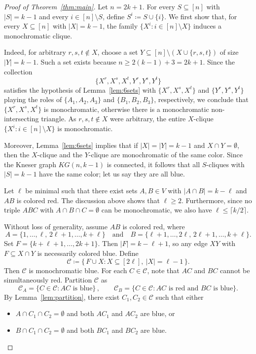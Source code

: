 \documentclass[11pt]{amsart}
\def\cC{{\mathcal{C}}}
\begin{document}
\begin{proof}[Proof of Theorem~\ref{thm:main}]
Let $n = 2k+1$. For every $S \subseteq [n]$ with $|S| = k-1$ and every $i \in [n] \setminus S$, define $S^{i} \coloneq S \cup \{i\}$. 
We first show that, for every $X \subseteq [n]$ with $|X| = k-1$, the family $\{X^{i} : i \in [n] \setminus X\}$ induces a monochromatic clique. 

Indeed, for arbitrary $r,s,t \notin X$, choose a set $Y \subseteq [n] \setminus (X \cup \{r,s,t\})$ of size $|Y| = k-1$. Such a set exists because $n \ge 2(k-1)+3 = 2k+1$. Since the collection
\[
\{X^{r}, X^{s}, X^{t}, Y^{r}, Y^{s}, Y^{t}\}
\]
satisfies the hypothesis of Lemma~\ref{lem:6sets} with $\{X^r, X^s, X^t\}$ and $\{Y^r, Y^s, Y^t\}$ playing the roles of $\{A_1, A_2, A_3\}$ and $\{B_1, B_2, B_3\}$, respectively, we conclude that $\{X^{r}, X^{s}, X^{t}\}$ is monochromatic, otherwise there is a monochromatic non-intersecting triangle. As $r,s,t \notin X$ were arbitrary, the entire $X$-clique $\{X^{i} : i \in [n] \setminus X\}$ is monochromatic.

Moreover, Lemma~\ref{lem:6sets} implies that if $|X| = |Y| = k-1$ and $X \cap Y = \emptyset$, then the $X$-clique and the $Y$-clique are monochromatic of the same color. Since the Kneser graph $KG(n,k-1)$ is connected, it follows that all $S$-cliques with $|S| = k-1$ have the same color; let us say they are all blue.

Let $\ell$ be minimal such that there exist sets $A,B \in V$ with $|A \cap B| = k - \ell$ and $AB$ is colored red. The discussion above shows that $\ell \ge 2$. Furthermore, since no triple $A B C$ with $A \cap B \cap C = \emptyset$ can be monochromatic, we also have $\ell \le \lceil k/2 \rceil$.

Without loss of generality, assume $AB$ is colored red, where
\[
A = \{1, \dots, \ell,\, 2\ell+1, \dots, k+\ell\}
\quad\text{and}\quad
B = \{\ell+1, \dots, 2\ell,\, 2\ell+1, \dots, k+\ell\}.
\]
Set $F = \{k+\ell+1, \dots, 2k+1\}$. Then $|F| = k - \ell + 1$, so any edge $XY$ with $F \subseteq X \cap Y$ is necessarily colored blue.
Define
\[
\cC \coloneq \{\, F \cup X : X \subseteq [2\ell],\ |X| = \ell - 1 \,\}.
\]
Then $\cC$ is monochromatic blue. For each $C \in \cC$, note that $AC$ and $BC$ cannot be simultaneously red. Partition $\cC$ as
\[
\cC_A = \{C \in \cC : AC \text{ is blue}\} \, ,
\qquad
\cC_B = \{C \in \cC : AC \text{ is red and } BC \text{ is blue}\}.
\]
By Lemma~\ref{lem:partition}, there exist $C_1, C_2 \in \cC$ such that either
\begin{itemize}
    \item $A \cap C_1 \cap C_2 = \emptyset$ and both $AC_1$ and $AC_2$ are blue, or
    \item $B \cap C_1 \cap C_2 = \emptyset$ and both $BC_1$ and $BC_2$ are blue. \hfill \qedhere
\end{itemize}
\end{proof}
\end{document}
